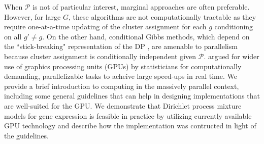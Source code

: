 When $\mathcal{P}$ is not of particular interest, marginal approaches are often preferable. However, for large $G$, these algorithms are not computationally tractable as they require one-at-a-time updating of the cluster assignment for each $g$ conditioning on all $g'\neq g$. On the other hand, conditional Gibbs methods, which depend on the ``stick-breaking" representation of the DP \citet{sethuraman}, are amenable to parallelism because cluster assignment is conditionally independent given $\mathcal{P}$. \citet{suchard} argued for wider use of graphics processing units (GPUs) by statisticians for computationally demanding, parallelizable tasks to acheive large speed-ups in real time. We provide a brief introduction to computing in the massively parallel context, including some general guidelines that can help in designing implementations that are well-suited for the GPU. We demonstrate that Dirichlet process mixture models for gene expression is feasible in practice by utilizing currently available GPU technology and describe how the implementation was contructed in light of the guidelines.

